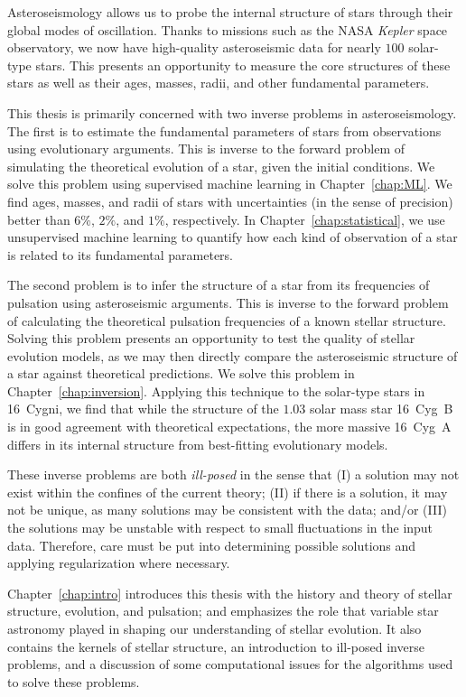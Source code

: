 Asteroseismology allows us to probe the internal structure of stars through their global modes of oscillation. 
Thanks to missions such as the NASA \emph{Kepler} space observatory, we now have high-quality asteroseismic data for nearly $100$ solar-type stars. 
This presents an opportunity to measure the core structures of these stars as well as their ages, masses, radii, and other fundamental parameters. 

This thesis is primarily concerned with two inverse problems in asteroseismology. 
The first is to estimate the fundamental parameters of stars from observations using evolutionary arguments. 
This is inverse to the forward problem of simulating the theoretical evolution of a star, given the initial conditions. 
We solve this problem using supervised machine learning in Chapter~\ref{chap:ML}. 
We find ages, masses, and radii of stars with uncertainties (in the sense of precision) better than $6\%$, $2\%$, and $1\%$, respectively. 
In Chapter~\ref{chap:statistical}, we use unsupervised machine learning to quantify how each kind of observation of a star is related to its fundamental parameters. 

The second problem is to infer the structure of a star from its frequencies of pulsation using asteroseismic arguments. 
This is inverse to the forward problem of calculating the theoretical pulsation frequencies of a known stellar structure. 
Solving this problem presents an opportunity to test the quality of stellar evolution models, as we may then directly compare the asteroseismic structure of a star against theoretical predictions. 
We solve this problem in Chapter~\ref{chap:inversion}. 
Applying this technique to the solar-type stars in 16~Cygni, we find that while the structure of the $1.03$ solar mass star 16~Cyg~B is in good agreement with theoretical expectations, the more massive 16~Cyg~A differs in its internal structure from best-fitting evolutionary models. 

These inverse problems are both \emph{ill-posed} in the sense that (I) a solution may not exist within the confines of the current theory; (II) if there is a solution, it may not be unique, as many solutions may be consistent with the data; and/or (III) the solutions may be unstable with respect to small fluctuations in the input data. 
Therefore, care must be put into determining possible solutions and applying regularization where necessary. 

Chapter~\ref{chap:intro} introduces this thesis with the history and theory of stellar structure, evolution, and pulsation; and emphasizes the role that variable star astronomy played in shaping our understanding of stellar evolution. 
It also contains the kernels of stellar structure, an introduction to ill-posed inverse problems, and a discussion of some computational issues for the algorithms used to solve these problems. 
